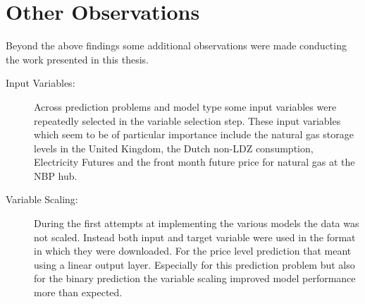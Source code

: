 \section{Other Observations}
Beyond the above findings some additional observations were made conducting the work presented in this thesis.
\begin{description}
\item[Input Variables:] Across prediction problems and model type some input variables were repeatedly selected in the variable selection step. These input variables which seem to be of particular importance include the natural gas storage levels in the United Kingdom, the Dutch non-LDZ consumption, Electricity Futures and the front month future price for natural gas at the NBP hub.
\item[Variable Scaling:] During the first attempts at implementing the various models the data was not scaled. Instead both input and target variable were used in the format in which they were downloaded. For the price level prediction that meant using a linear output layer. Especially for this prediction problem but also for the binary prediction the variable scaling improved model performance more than expected.
\end{description}
